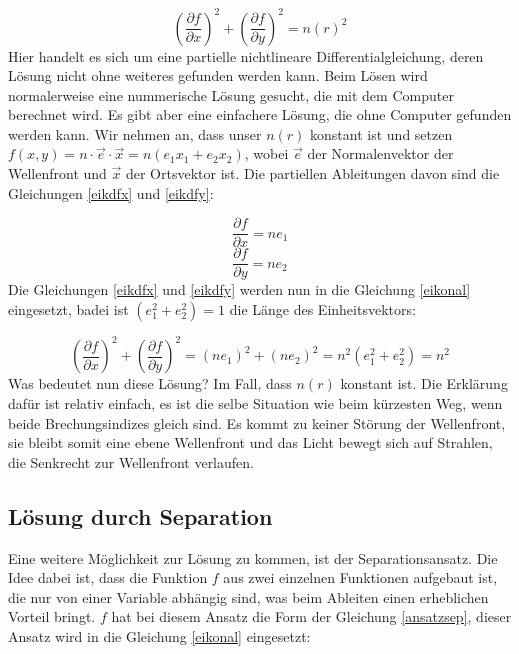 \begin{refsection}
\begin{equation}\label{eikonal}
\left( \dfrac{\partial f}{\partial x}\right)^{2} + \left( \dfrac{\partial f}{\partial y}\right) ^{2} = n(r)^{2}
\end{equation}
Hier handelt  es sich um eine partielle nichtlineare Differentialgleichung, deren Lösung nicht ohne weiteres gefunden werden kann. Beim Lösen wird normalerweise eine nummerische Lösung gesucht, die mit dem Computer berechnet wird. Es gibt aber eine einfachere Lösung, die ohne Computer gefunden werden kann. Wir nehmen an, dass unser $n(r)$ konstant ist und setzen $f(x,y)=n\cdot\vec{e}\cdot\vec{x}= n(e_{1}x_{1}+e_{2}x_{2})$, wobei $\vec{e}$ der Normalenvektor der Wellenfront und $\vec{x}$ der Ortsvektor ist. Die partiellen Ableitungen davon sind die Gleichungen \eqref{eikdfx} und \eqref{eikdfy}:

\begin{equation}\label{eikdfx}
\dfrac{\partial f}{\partial x} = ne_{1}
\end{equation}
\begin{equation}\label{eikdfy}
\dfrac{\partial f}{\partial y} = ne_{2}
\end{equation}
Die Gleichungen \eqref{eikdfx} und \eqref{eikdfy} werden nun in die Gleichung \eqref{eikonal} eingesetzt, badei ist $(e_{1}^{2}+e_{2}^{2})=1$ die Länge des Einheitsvektors:

\begin{equation}\label{lösung_eik}
\left( \dfrac{\partial f}{\partial x}\right)^{2} + \left( \dfrac{\partial f}{\partial y}\right) ^{2} = \left( ne_{1}\right) ^{2}+\left( ne_{2}\right)^{2}=n^{2}(e_{1}^{2}+e_{2}^{2})=n^{2}
\end{equation}
Was bedeutet nun diese Lösung? Im Fall, dass $n(r)$ konstant ist. Die Erklärung dafür ist relativ einfach, es ist die selbe Situation wie beim kürzesten Weg, wenn beide Brechungsindizes gleich sind. Es kommt zu keiner Störung der Wellenfront, sie bleibt somit eine ebene Wellenfront und das Licht bewegt sich auf Strahlen, die Senkrecht zur Wellenfront verlaufen.

\subsection{Lösung durch Separation}
Eine weitere Möglichkeit zur Lösung zu kommen, ist der Separationsansatz. Die Idee dabei ist, dass die Funktion $f$ aus zwei einzelnen Funktionen aufgebaut ist, die nur von einer Variable abhängig sind, was beim Ableiten einen erheblichen Vorteil bringt. $f$ hat bei diesem Ansatz die Form der Gleichung \eqref{ansatzsep}, dieser Ansatz wird in die Gleichung \eqref{eikonal} eingesetzt:  


\end{refsection}
